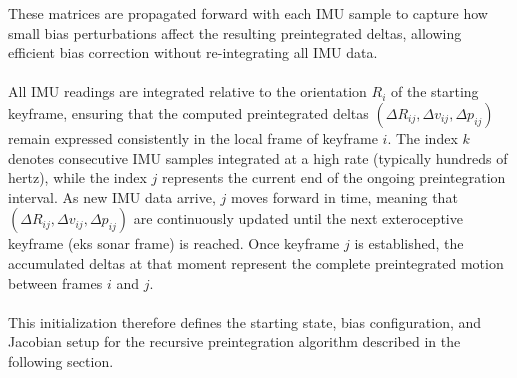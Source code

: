 These matrices are propagated forward with each IMU sample to capture how small bias perturbations affect the resulting preintegrated deltas, allowing efficient bias correction without re-integrating all IMU data.
\\ \\
All IMU readings are integrated relative to the orientation $R_i$ of the starting keyframe, ensuring that the computed preintegrated deltas $(\Delta R_{ij}, \Delta v_{ij}, \Delta p_{ij})$ remain expressed consistently in the local frame of keyframe $i$. The index $k$ denotes consecutive IMU samples integrated at a high rate (typically hundreds of hertz), while the index $j$ represents the current end of the ongoing preintegration interval. As new IMU data arrive, $j$ moves forward in time, meaning that $(\Delta R_{ij}, \Delta v_{ij}, \Delta p_{ij})$ are continuously updated until the next exteroceptive keyframe (eks sonar frame) is reached. Once keyframe $j$ is established, the accumulated deltas at that moment represent the complete preintegrated motion between frames $i$ and $j$.
\\ \\
This initialization therefore defines the starting state, bias configuration, and Jacobian setup for the recursive preintegration algorithm described in the following section.



